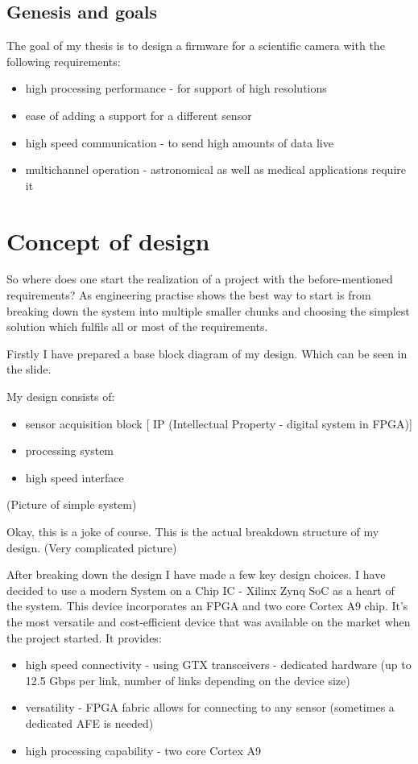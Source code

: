 \documentclass[10pt,a4paper]{article}
\begin{document}
\subsection{Genesis and goals}

The goal of my thesis is to design a firmware for a scientific camera with the following requirements:
\begin{itemize}
\item high processing performance - for support of high resolutions
\item ease of adding a support for a different sensor
\item high speed communication - to send high amounts of data live
\item multichannel operation - astronomical as well as medical applications require it
\end{itemize}

\section{Concept of design}

So where does one start the realization of a project with the before-mentioned requirements? As engineering practise shows the best way to start is from breaking down the system into multiple smaller chunks and choosing the simplest solution which fulfils all or most of the requirements.

Firstly I have prepared a base block diagram of my design. Which can be seen in the slide. 

My design consists of:
\begin{itemize}
\item sensor acquisition block [ IP (Intellectual Property - digital system in FPGA)]
\item processing system
\item high speed interface
\end{itemize}

(Picture of simple system)

Okay, this is a joke of course. This is the actual breakdown structure of my design. (Very complicated picture)

After breaking down the design I have made a few key design choices. I have decided to use a modern System on a Chip IC - Xilinx Zynq SoC as a heart of the system. This device incorporates an FPGA and two core Cortex A9 chip. It's the most versatile and cost-efficient device that was available on the market when the project started. It provides:
\begin{itemize}
\item high speed connectivity - using GTX transceivers - dedicated hardware (up to 12.5 Gbps per link, number of links depending on the device size)
\item versatility - FPGA fabric allows for connecting to any sensor (sometimes a dedicated AFE is needed)
\item high processing capability - two core Cortex A9
\end{itemize}
\end{document}
